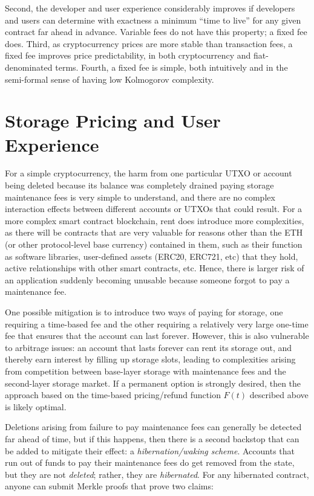 \documentclass[12pt, final]{article}
\begin{document}
Second, the developer and user experience considerably improves if developers and users can determine with exactness a minimum ``time to live'' for any given contract far ahead in advance. Variable fees do not have this property; a fixed fee does. Third, as cryptocurrency prices are more stable than transaction fees, a fixed fee improves price predictability, in both cryptocurrency and fiat-denominated terms. Fourth, a fixed fee is simple, both intuitively and in the semi-formal sense of having low Kolmogorov complexity.

\section{Storage Pricing and User Experience}

For a simple cryptocurrency, the harm from one particular UTXO or account being deleted because its balance was completely drained paying storage maintenance fees is very simple to understand, and there are no complex interaction effects between different accounts or UTXOs that could result. For a more complex smart contract blockchain, rent does introduce more complexities, as there will be contracts that are very valuable for reasons other than the ETH (or other protocol-level base currency) contained in them, such as their function as software libraries, user-defined assets (ERC20, ERC721, etc) that they hold, active relationships with other smart contracts, etc. Hence, there is larger risk of an application suddenly becoming unusable because someone forgot to pay a maintenance fee. 

One possible mitigation is to introduce two ways of paying for storage, one requiring a time-based fee and the other requiring a relatively very large one-time fee that ensures that the account can last forever. However, this is also vulnerable to arbitrage issues: an account that lasts forever can rent its storage out, and thereby earn interest by filling up storage slots, leading to complexities arising from competition between base-layer storage with maintenance fees and the second-layer storage market. If a permanent option is strongly desired, then the approach based on the time-based pricing/refund function $F(t)$ described above is likely optimal.

Deletions arising from failure to pay maintenance fees can generally be detected far ahead of time, but if this happens, then there is a second backstop that can be added to mitigate their effect: a \emph{hibernation/waking scheme}. Accounts that run out of funds to pay their maintenance fees do get removed from the state, but they are not \emph{deleted}; rather, they are \emph{hibernated}. For any hibernated contract, anyone can submit Merkle proofs that prove two claims:
\end{document}
